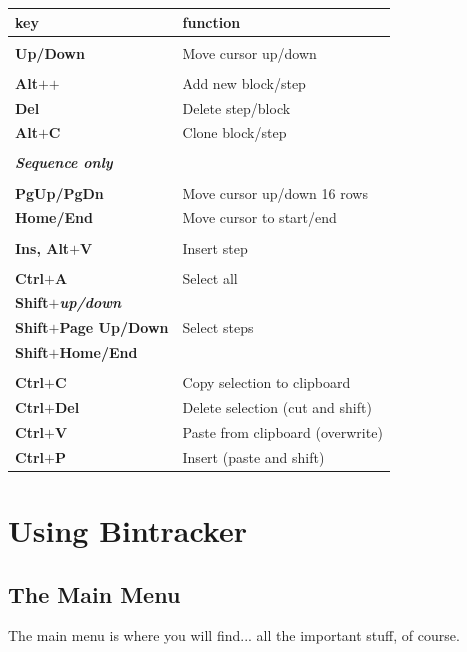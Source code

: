 \documentclass[12pt]{report}	%
\begin{document}
\begin{longtable}{p{} p{} }
\textbf{key} & \textbf{function} \\
\hline
\\
\textbf{Up/Down} & Move cursor up/down\\
\\
\textbf{Alt\(\bm{+}\)\(\bm{+}\)} & Add new block/step \\
\textbf{Del} & Delete step/block \\
\textbf{Alt\(\bm{+}\)C} & Clone block/step \\
\\
\textit{\textbf{Sequence only}} & \\
\hline
\\
\textbf{PgUp/PgDn} & Move cursor up/down 16 rows \\
\textbf{Home/End} & Move cursor to start/end \\
\\
\textbf{Ins, Alt\(\bm{+}\)V} & Insert step \\
\\
\textbf{Ctrl\(\bm{+}\)A} & Select all \\
\textbf{Shift\(\bm{+}\)\textit{up/down}} &\\
\textbf{Shift\(\bm{+}\)Page Up/Down} & Select steps\\
\textbf{Shift\(\bm{+}\)Home/End} & \\
\\
\textbf{Ctrl\(\bm{+}\)C} & Copy selection to clipboard \\
\textbf{Ctrl\(\bm{+}\)Del} & Delete selection (cut and shift) \\
\textbf{Ctrl\(\bm{+}\)V} & Paste from clipboard (overwrite) \\
\textbf{Ctrl\(\bm{+}\)P} & Insert (paste and shift) \\
\end{longtable}


\chapter{Using Bintracker}
\section{The Main Menu}

The main menu is where you will find... all the important stuff, of course.
\end{document}
